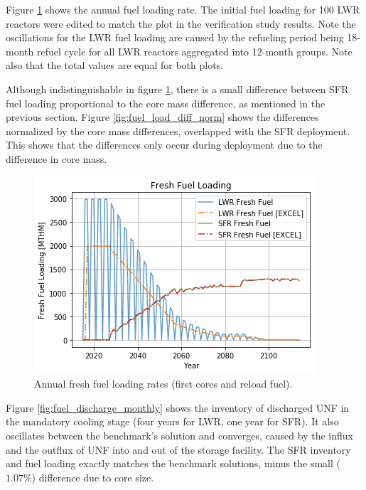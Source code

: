 Figure \ref{fig:fuel_load} shows the annual fuel loading rate.
The initial fuel loading for 100 \gls{LWR} reactors were edited to match
the plot in the verification
study results. Note the oscillations for the \gls{LWR} fuel loading
are caused by the refueling period being 18-month refuel cycle for all \gls{LWR} reactors
aggregated into 12-month groups. Note also that the total values
are equal for both plots.

Although indistinguishable in figure \ref{fig:fuel_load},
there is a small difference between \gls{SFR} fuel loading proportional
to the core mass difference, as mentioned in the previous section.
Figure \ref{fig:fuel_load_diff_norm} shows the
differences normalized by the core mass differences, overlapped with the
\gls{SFR} deployment. This shows that the differences only occur during
deployment due to the difference in core mass.


\begin{figure}[htbp!]
    \begin{center}
        \includegraphics[scale=0.5]{./images/results_18/fuel_load.png}
    \end{center}
        \caption{Annual fresh fuel loading rates (first cores and reload fuel).}
    \label{fig:fuel_load}
\end{figure}

Figure \ref{fig:fuel_discharge_monthly} shows the inventory of discharged
\gls{UNF} in the mandatory cooling stage (four years for \gls{LWR}, one year for \gls{SFR}).
It also oscillates between the benchmark's
solution and converges, caused by the influx and the outflux of \gls{UNF}
into and out of the storage facility.
The \gls{SFR} inventory and fuel loading
exactly matches the benchmark solutions, minus the small ($1.07\%$) difference due to core
size.

